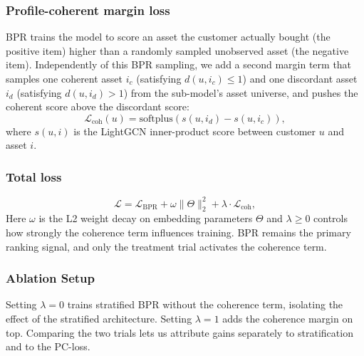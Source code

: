 \subsubsection{Profile-coherent margin loss}
BPR trains the model to score an asset the customer actually bought (the positive item) higher than a randomly sampled unobserved asset (the negative item). Independently of this BPR sampling, we add a second margin term that samples one coherent asset $i_c$ (satisfying $d(u, i_c) \leq 1$) and one discordant asset $i_d$ (satisfying $d(u, i_d) > 1$) from the sub-model's asset universe, and pushes the coherent score above the discordant score:
\begin{equation}
\mathcal{L}_{\text{coh}}(u) = \text{softplus}\!\left(s(u, i_d) - s(u, i_c)\right),
\end{equation}
where $s(u, i)$ is the LightGCN inner-product score between customer $u$ and asset $i$.

\subsubsection{Total loss}
\begin{equation}
\mathcal{L} = \mathcal{L}_{\text{BPR}} + \omega \|\Theta\|_2^2 + \lambda \cdot \mathcal{L}_{\text{coh}},
\end{equation}
Here $\omega$ is the L2 weight decay on embedding parameters $\Theta$ and $\lambda \geq 0$ controls how strongly the coherence term influences training. BPR remains the primary ranking signal, and only the treatment trial activates the coherence term.

\subsubsection{Ablation Setup}
Setting $\lambda = 0$ trains stratified BPR without the coherence term, isolating the effect of the stratified architecture. Setting $\lambda = 1$ adds the coherence margin on top. Comparing the two trials lets us attribute gains separately to stratification and to the PC-loss.

